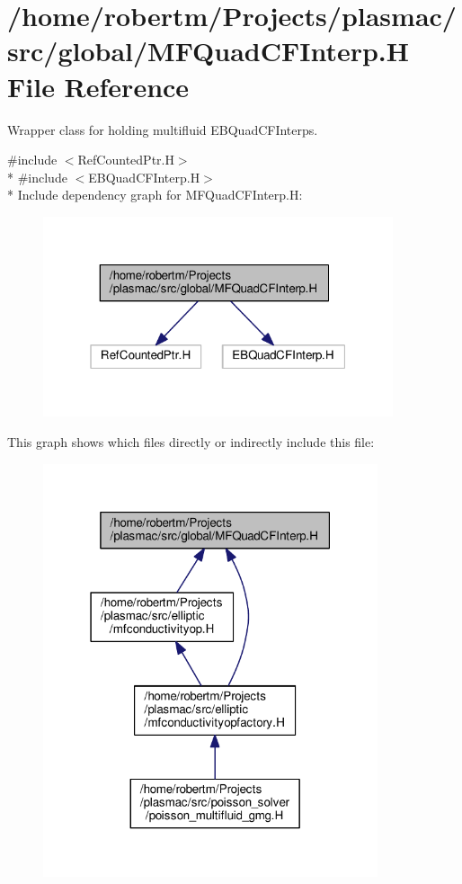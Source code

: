 \hypertarget{MFQuadCFInterp_8H}{}\section{/home/robertm/\+Projects/plasmac/src/global/\+M\+F\+Quad\+C\+F\+Interp.H File Reference}
\label{MFQuadCFInterp_8H}


Wrapper class for holding multifluid E\+B\+Quad\+C\+F\+Interps.  


{\ttfamily \#include $<$Ref\+Counted\+Ptr.\+H$>$}\\*
{\ttfamily \#include $<$E\+B\+Quad\+C\+F\+Interp.\+H$>$}\\*
Include dependency graph for M\+F\+Quad\+C\+F\+Interp.\+H\+:\nopagebreak
\begin{figure}[H]
\begin{center}
\leavevmode
\includegraphics[width=292pt]{MFQuadCFInterp_8H__incl}
\end{center}
\end{figure}
This graph shows which files directly or indirectly include this file\+:\nopagebreak
\begin{figure}[H]
\begin{center}
\leavevmode
\includegraphics[width=279pt]{MFQuadCFInterp_8H__dep__incl}
\end{center}
\end{figure}
